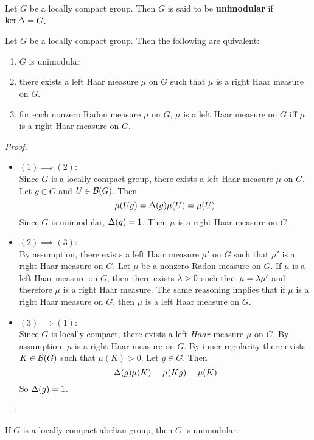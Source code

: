 \documentclass{book}
\begin{document}
	\begin{defn}  
		Let $G$ be a locally compact group. Then $G$ is said to be \textbf{unimodular} if $\ker \Delta = G$.  
	\end{defn}
	
	\begin{ex}  
		Let $G$ be a locally compact group. Then the following are quivalent: 
		\begin{enumerate}
			\item $G$ is unimodular 
			\item there exists a left  Haar measure $\mu$ on $G$ such that $\mu$ is a right Haar measure on $G$.
			\item for each nonzero Radon measure $\mu$ on $G$, $\mu$ is a left Haar measure on $G$ iff $\mu$ is a right Haar measure on $G$.
		\end{enumerate}
	\end{ex}
	
	\begin{proof}\
		\begin{itemize}
			\item $(1) \implies (2)$:\\ Since $G$ is a locally compact group, there exists a left Haar measure $\mu$ on $G$. Let $g \in G$ and $U \in \mathcal{B}(G)$. Then $$\mu(Ug) = \Delta(g) \mu(U) = \mu(U)$$ Since $G$ is unimodular, $\Delta(g) = 1$. Then $\mu$ is a right Haar measure on $G$. 
			\item $(2) \implies (3)$:\\ By assumption, there exists a left  Haar measure $\mu'$ on $G$ such that $\mu'$ is a right Haar measure on $G$. Let $\mu$ be a nonzero Radon measure on $G$. If $\mu$ is a left Haar measure on $G$, then there exists $\lambda >0$ such that $\mu = \lambda \mu'$ and therefore $\mu$ is a right Haar measure. The same reasoning implies that if $\mu$ is a right Haar measure on $G$, then $\mu$ is a left Haar measure on $G$.
			\item $(3) \implies (1)$: \\ Since $G$ is locally compact, there exists a left $Haar$ measure $\mu$ on $G$. By assumption, $\mu$ is a right Haar measure on $G$. By inner regularity there exists $K \in \mathcal{B}(G)$ such that $\mu(K) > 0$. Let $g \in G$. Then $$\Delta(g) \mu(K) = \mu(Kg) = \mu(K)$$ So $\Delta(g) = 1$.
		\end{itemize}
	\end{proof}

	\begin{note}
		If $G$ is a locally compact abelian group, then $G$ is unimodular.
	\end{note}
	
\end{document}
